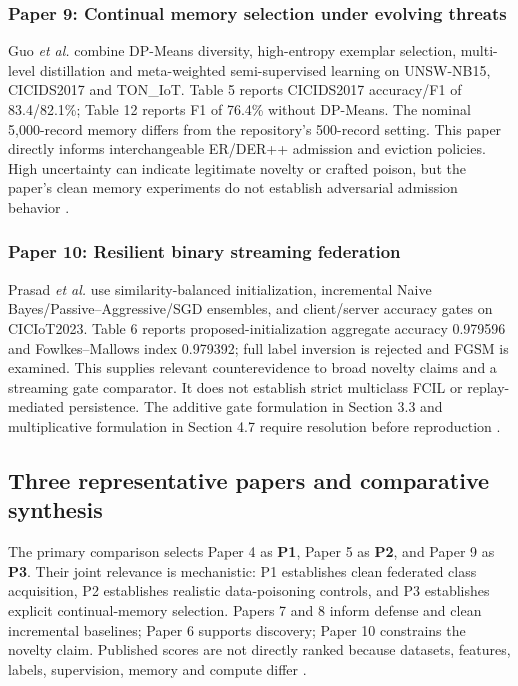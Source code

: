 \documentclass[10pt,a4paper]{article}
\begin{document}
\subsubsection{Paper 9: Continual memory selection under evolving threats}
Guo \emph{et al.} combine DP-Means diversity, high-entropy exemplar selection, multi-level distillation and meta-weighted semi-supervised learning on UNSW-NB15, CICIDS2017 and TON\_IoT. Table 5 reports CICIDS2017 accuracy/F1 of 83.4/82.1\%; Table 12 reports F1 of 76.4\% without DP-Means. The nominal 5,000-record memory differs from the repository's 500-record setting. This paper directly informs interchangeable ER/DER++ admission and eviction policies. High uncertainty can indicate legitimate novelty or crafted poison, but the paper's clean memory experiments do not establish adversarial admission behavior \cite{guo}.

\subsubsection{Paper 10: Resilient binary streaming federation}
Prasad \emph{et al.} use similarity-balanced initialization, incremental Naive Bayes/Passive--Aggressive/SGD ensembles, and client/server accuracy gates on CICIoT2023. Table 6 reports proposed-initialization aggregate accuracy 0.979596 and Fowlkes--Mallows index 0.979392; full label inversion is rejected and FGSM is examined. This supplies relevant counterevidence to broad novelty claims and a streaming gate comparator. It does not establish strict multiclass FCIL or replay-mediated persistence. The additive gate formulation in Section 3.3 and multiplicative formulation in Section 4.7 require resolution before reproduction \cite{ensemble}.

\subsection{Three representative papers and comparative synthesis}
The primary comparison selects Paper 4 as \textbf{P1}, Paper 5 as \textbf{P2}, and Paper 9 as \textbf{P3}. Their joint relevance is mechanistic: P1 establishes clean federated class acquisition, P2 establishes realistic data-poisoning controls, and P3 establishes explicit continual-memory selection. Papers 7 and 8 inform defense and clean incremental baselines; Paper 6 supports discovery; Paper 10 constrains the novelty claim. Published scores are not directly ranked because datasets, features, labels, supervision, memory and compute differ \cite{carillo,lavaur,guo,wei,cerasuolo,cnd,ensemble}.
\end{document}
